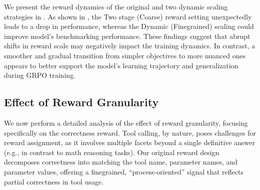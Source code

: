 We present the reward dynamics of the original and two dynamic scaling strategies in . As shown in , the Two stage (Coarse) reward setting unexpectedly leads to a drop in performance, whereas the Dynamic (Finegrained) scaling could improve model's benchmarking performance. These findings suggest that abrupt shifts in reward scale may negatively impact the training dynamics. In contrast, a smoother and gradual transition from simpler objectives to more nuanced ones appears to better support the model’s learning trajectory and generalization during GRPO training.




\subsection{Effect of Reward Granularity}
We now perform a detailed analysis of the effect of reward granularity, focusing specifically on the correctness reward. Tool calling, by nature, poses challenges for reward assignment, as it involves multiple facets beyond a single definitive answer (e.g., in contrast to math reasoning tasks). Our original reward design decomposes correctness into matching the tool name, parameter names, and parameter values, offering a finegrained, ``process-oriented'' signal that reflects partial correctness in tool usage.


